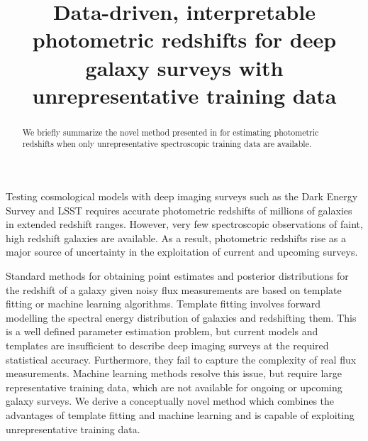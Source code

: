 \documentclass[9pt, conference, a4paper]{IEEEtran}
\begin{document}
\title{Data-driven, interpretable photometric redshifts for deep galaxy surveys with  unrepresentative training data}

\author{%
%
%
%
}

\maketitle


\begin{abstract}
We briefly summarize the novel method presented in \cite{LeistedtHogg:2016} for estimating photometric redshifts when only unrepresentative spectroscopic training data are available.
\end{abstract}

\medskip

Testing cosmological models with deep imaging surveys such as the Dark Energy Survey and LSST requires accurate photometric redshifts of millions of galaxies in extended redshift ranges. However, very few spectroscopic observations of faint, high redshift galaxies are available. As a result, photometric redshifts rise as a major source of uncertainty in the exploitation of current and upcoming surveys. 

Standard methods for obtaining point estimates and posterior distributions for the redshift of a galaxy given noisy flux measurements are based on template fitting or machine learning algorithms. Template fitting involves forward modelling the spectral energy distribution of galaxies and redshifting them. This is a well defined parameter estimation problem, but current models and templates are insufficient to describe deep imaging surveys at the required statistical accuracy. Furthermore, they fail to capture the complexity of real flux measurements. Machine learning methods resolve this issue, but require large representative training data, which are not available for ongoing or upcoming galaxy surveys. We derive a conceptually novel method which combines the advantages of template fitting and machine learning and is capable of exploiting unrepresentative training data.
\end{document}
